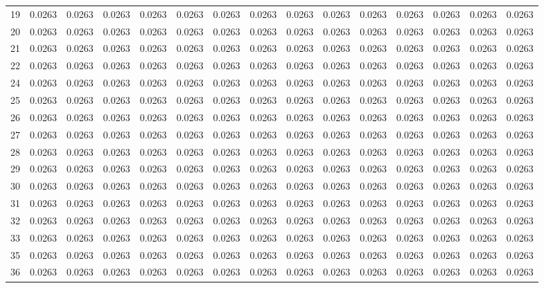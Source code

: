\begin{table}[H]
\begin{tabular}{rrrrrrrrrrrrrrr}
19 & 0.0263 & 0.0263 & 0.0263 & 0.0263 & 0.0263 & 0.0263 & 0.0263 & 0.0263 & 0.0263 & 0.0263 & 0.0263 & 0.0263 & 0.0263 & 0.0263 \\
20 & 0.0263 & 0.0263 & 0.0263 & 0.0263 & 0.0263 & 0.0263 & 0.0263 & 0.0263 & 0.0263 & 0.0263 & 0.0263 & 0.0263 & 0.0263 & 0.0263 \\
21 & 0.0263 & 0.0263 & 0.0263 & 0.0263 & 0.0263 & 0.0263 & 0.0263 & 0.0263 & 0.0263 & 0.0263 & 0.0263 & 0.0263 & 0.0263 & 0.0263 \\
22 & 0.0263 & 0.0263 & 0.0263 & 0.0263 & 0.0263 & 0.0263 & 0.0263 & 0.0263 & 0.0263 & 0.0263 & 0.0263 & 0.0263 & 0.0263 & 0.0263 \\
24 & 0.0263 & 0.0263 & 0.0263 & 0.0263 & 0.0263 & 0.0263 & 0.0263 & 0.0263 & 0.0263 & 0.0263 & 0.0263 & 0.0263 & 0.0263 & 0.0263 \\
25 & 0.0263 & 0.0263 & 0.0263 & 0.0263 & 0.0263 & 0.0263 & 0.0263 & 0.0263 & 0.0263 & 0.0263 & 0.0263 & 0.0263 & 0.0263 & 0.0263 \\
26 & 0.0263 & 0.0263 & 0.0263 & 0.0263 & 0.0263 & 0.0263 & 0.0263 & 0.0263 & 0.0263 & 0.0263 & 0.0263 & 0.0263 & 0.0263 & 0.0263 \\
27 & 0.0263 & 0.0263 & 0.0263 & 0.0263 & 0.0263 & 0.0263 & 0.0263 & 0.0263 & 0.0263 & 0.0263 & 0.0263 & 0.0263 & 0.0263 & 0.0263 \\
28 & 0.0263 & 0.0263 & 0.0263 & 0.0263 & 0.0263 & 0.0263 & 0.0263 & 0.0263 & 0.0263 & 0.0263 & 0.0263 & 0.0263 & 0.0263 & 0.0263 \\
29 & 0.0263 & 0.0263 & 0.0263 & 0.0263 & 0.0263 & 0.0263 & 0.0263 & 0.0263 & 0.0263 & 0.0263 & 0.0263 & 0.0263 & 0.0263 & 0.0263 \\
30 & 0.0263 & 0.0263 & 0.0263 & 0.0263 & 0.0263 & 0.0263 & 0.0263 & 0.0263 & 0.0263 & 0.0263 & 0.0263 & 0.0263 & 0.0263 & 0.0263 \\
31 & 0.0263 & 0.0263 & 0.0263 & 0.0263 & 0.0263 & 0.0263 & 0.0263 & 0.0263 & 0.0263 & 0.0263 & 0.0263 & 0.0263 & 0.0263 & 0.0263 \\
32 & 0.0263 & 0.0263 & 0.0263 & 0.0263 & 0.0263 & 0.0263 & 0.0263 & 0.0263 & 0.0263 & 0.0263 & 0.0263 & 0.0263 & 0.0263 & 0.0263 \\
33 & 0.0263 & 0.0263 & 0.0263 & 0.0263 & 0.0263 & 0.0263 & 0.0263 & 0.0263 & 0.0263 & 0.0263 & 0.0263 & 0.0263 & 0.0263 & 0.0263 \\
35 & 0.0263 & 0.0263 & 0.0263 & 0.0263 & 0.0263 & 0.0263 & 0.0263 & 0.0263 & 0.0263 & 0.0263 & 0.0263 & 0.0263 & 0.0263 & 0.0263 \\
36 & 0.0263 & 0.0263 & 0.0263 & 0.0263 & 0.0263 & 0.0263 & 0.0263 & 0.0263 & 0.0263 & 0.0263 & 0.0263 & 0.0263 & 0.0263 & 0.0263 \\

\end{tabular}
\end{table}
